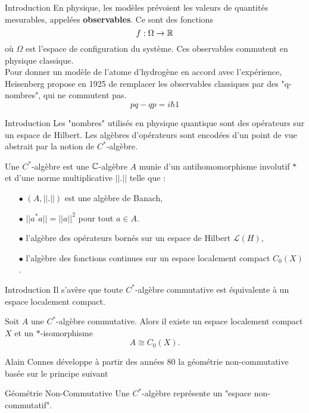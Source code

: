 \begin{frame}{Introduction}
En physique, les modèles prévoient les valeurs de quantités mesurables, appelées \textbf{observables}. Ce sont des fonctions
\[f:\Omega \rightarrow \mathbb R\]
où $\Omega$ est l'espace de configuration du système. Ces observables commutent en physique classique.\\
\vspace{0.3 cm} 
Pour donner un modèle de l'atome d'hydrogène en accord avec l'expérience, Heisenberg propose en 1925 de remplacer les observables classiques par des "q-nombres", qui ne commutent pas.
\[pq -qp = i\hbar 1\]
\end{frame}

\begin{frame}{Introduction}
Les "nombres" utilisés en physique quantique sont des opérateurs sur un espace de Hilbert. Les algèbres d'opérateurs sont encodées d'un point de vue abstrait par la notion de $C^*$-algèbre. 
\vspace{0.3 cm}
\begin{definitionfr}
Une $C^*$-algèbre est une $\mathbb C$-algèbre $A$ munie d'un antihomomorphisme involutif $*$ et d'une norme multiplicative $||.||$ telle que :
\begin{itemize}
\item[$\bullet$] $(A,||.||)$ est une algèbre de Banach,
\item[$\bullet$] $||a^*a|| = ||a||^2$ pour tout $a\in A$.
\end{itemize}
\end{definitionfr}

\begin{itemize}
\item[$\bullet$] l'algèbre des opérateurs bornés sur un espace de Hilbert $\mathcal L(H)$, 
\item[$\bullet$] l'algèbre des fonctions continues sur un espace localement compact $C_0(X)$.
\end{itemize}

\end{frame}

\begin{frame}{Introduction}
Il s'avère que toute $C^*$-algèbre commutative est équivalente à un espace localement compact.
\begin{thmfr}
Soit $A$ une $C^*$-algèbre commutative. Alors il existe un espace localement compact $X$ et un $*$-isomorphisme 
\[A\cong C_0(X).\]
\end{thmfr}

Alain Connes développe à partir des années 80 la géométrie non-commutative basée sur le principe suivant
\begin{block}{Géométrie Non-Commutative}
Une $C^*$-algèbre représente un "espace non-commutatif". 
\end{block}

\end{frame}

